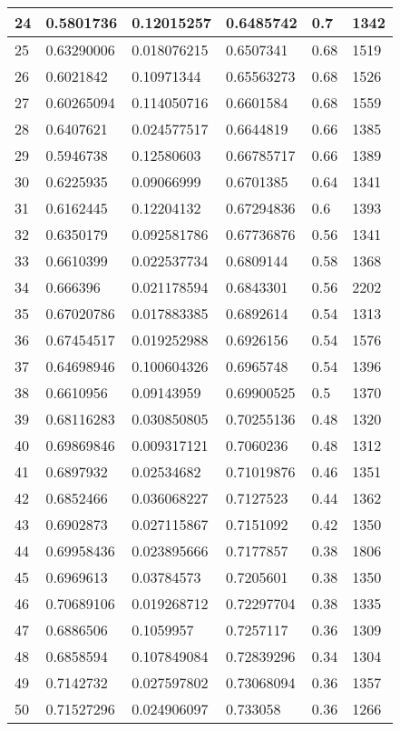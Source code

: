 \begin{longtable}{|l|l|l|l|l|l|}
24 & 0.5801736 & 0.12015257 & 0.6485742 & 0.7 & 1342 \\ \hline 
25 & 0.63290006 & 0.018076215 & 0.6507341 & 0.68 & 1519 \\ \hline 
26 & 0.6021842 & 0.10971344 & 0.65563273 & 0.68 & 1526 \\ \hline 
27 & 0.60265094 & 0.114050716 & 0.6601584 & 0.68 & 1559 \\ \hline 
28 & 0.6407621 & 0.024577517 & 0.6644819 & 0.66 & 1385 \\ \hline 
29 & 0.5946738 & 0.12580603 & 0.66785717 & 0.66 & 1389 \\ \hline 
30 & 0.6225935 & 0.09066999 & 0.6701385 & 0.64 & 1341 \\ \hline 
31 & 0.6162445 & 0.12204132 & 0.67294836 & 0.6 & 1393 \\ \hline 
32 & 0.6350179 & 0.092581786 & 0.67736876 & 0.56 & 1341 \\ \hline 
33 & 0.6610399 & 0.022537734 & 0.6809144 & 0.58 & 1368 \\ \hline 
34 & 0.666396 & 0.021178594 & 0.6843301 & 0.56 & 2202 \\ \hline 
35 & 0.67020786 & 0.017883385 & 0.6892614 & 0.54 & 1313 \\ \hline 
36 & 0.67454517 & 0.019252988 & 0.6926156 & 0.54 & 1576 \\ \hline 
37 & 0.64698946 & 0.100604326 & 0.6965748 & 0.54 & 1396 \\ \hline 
38 & 0.6610956 & 0.09143959 & 0.69900525 & 0.5 & 1370 \\ \hline 
39 & 0.68116283 & 0.030850805 & 0.70255136 & 0.48 & 1320 \\ \hline 
40 & 0.69869846 & 0.009317121 & 0.7060236 & 0.48 & 1312 \\ \hline 
41 & 0.6897932 & 0.02534682 & 0.71019876 & 0.46 & 1351 \\ \hline 
42 & 0.6852466 & 0.036068227 & 0.7127523 & 0.44 & 1362 \\ \hline 
43 & 0.6902873 & 0.027115867 & 0.7151092 & 0.42 & 1350 \\ \hline 
44 & 0.69958436 & 0.023895666 & 0.7177857 & 0.38 & 1806 \\ \hline 
45 & 0.6969613 & 0.03784573 & 0.7205601 & 0.38 & 1350 \\ \hline 
46 & 0.70689106 & 0.019268712 & 0.72297704 & 0.38 & 1335 \\ \hline 
47 & 0.6886506 & 0.1059957 & 0.7257117 & 0.36 & 1309 \\ \hline 
48 & 0.6858594 & 0.107849084 & 0.72839296 & 0.34 & 1304 \\ \hline 
49 & 0.7142732 & 0.027597802 & 0.73068094 & 0.36 & 1357 \\ \hline 
50 & 0.71527296 & 0.024906097 & 0.733058 & 0.36 & 1266 \\ \hline 
\end{longtable}